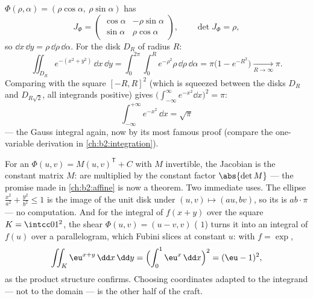 \begin{example}\label{ex:b2:multint:polar}
$\Phi(\rho, \alpha) = (\rho\cos\alpha,\ \rho\sin\alpha)$ has
\[
J_\Phi = \begin{pmatrix}
\cos\alpha & -\rho\sin\alpha\\
\sin\alpha & \rho\cos\alpha
\end{pmatrix},
\qquad \det J_\Phi = \rho ,
\]
so $\dd x\,\dd y = \rho\,\dd\rho\,\dd\alpha$. For the disk $D_R$
of radius $R$:
\[
\iint_{D_R} e^{-(x^2 + y^2)}\,\dd x\,\dd y
= \int_0^{2\pi}\!\!\int_0^R e^{-\rho^2}\rho\,\dd\rho\,\dd\alpha
= \pi\bigl(1 - e^{-R^2}\bigr)
\xrightarrow[R\to\infty]{} \pi .
\]
Comparing with the square $[-R, R]^2$ (which is squeezed between
the disks $D_R$ and $D_{R\sqrt2}$, all integrands positive) gives
$\bigl(\int_{-\infty}^\infty e^{-x^2}\dd x\bigr)^2 = \pi$:
\[
\boxed{\ \int_{-\infty}^{+\infty} e^{-x^2}\,\dd x = \sqrt{\pi}\ }
\]
--- the Gauss integral again, now by its most famous proof
(compare the one-variable derivation in
\cref{ch:b2:integration}).
\end{example}

\begin{example}\label{ex:b2:multint:affine}
For an  $\Phi(u, v) = M(u, v)^{\mathsf T} + C$ with
$M$ invertible, the Jacobian is the constant matrix $M$:
 are multiplied by the constant factor $\abs{\det M}$
--- the promise made in \cref{ch:b2:affine} is now a theorem.
Two immediate uses. The ellipse $\frac{x^2}{a^2} +
\frac{y^2}{b^2} \leq 1$ is the image of the unit disk under
$(u, v) \mapsto (au, bv)$, so its  is $ab \cdot \pi$ ---
no computation. And for the integral of $f(x + y)$ over the
square $K = \intcc01^2$, the shear $\Phi(u, v) = (u - v, v)$
( $1$) turns it into an integral of $f(u)$ over a
parallelogram, which Fubini slices at constant $u$: with $f =
\exp$,
\[
\iint_K \eu^{x+y}\,\dd x\,\dd y
= \Bigl(\int_0^1 \eu^x\,\dd x\Bigr)^2 = (\eu - 1)^2,
\]
as the product structure confirms. Choosing coordinates
adapted to the integrand --- not to the domain --- is the
other half of the craft.
\end{example}


